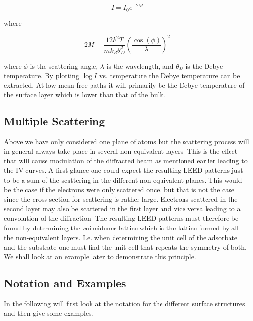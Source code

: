 \begin{equation}
I=I_0e^{-2M}
\end{equation}

\noindent where

\begin{equation}
2M=\frac{12h^2T}{mk_B\theta_D^2}\left(\frac{\cos(\phi)}{\lambda}\right)^2
\end{equation}

\noindent where $\phi$ is the scattering angle, $\lambda$ is the wavelength, and $\theta_D$ is the Debye temperature. By plotting $\log{I}$ vs. temperature the Debye temperature can be extracted. At low mean free paths it will primarily be the Debye temperature of the surface layer which is lower than that of the bulk.

\subsection{Multiple Scattering}
Above we have only considered one plane of atoms but the scattering process will in general always take place in several non-equivalent layers. This is the effect that will cause modulation of the diffracted beam as mentioned earlier leading to the IV-curves. A first glance one could expect the resulting LEED patterns just to be a sum of the scattering in the different non-equivalent planes. This would be the case if the electrons were only scattered once, but that is not the case since the cross section for scattering is rather large. Electrons scattered in the second layer may also be scattered in the first layer and vice versa leading to a convolution of the diffraction. The resulting LEED patterns must therefore be found by determining the {\emph coincidence lattice} which is the lattice formed by all the non-equivalent layers. I.e. when determining the unit cell of the adsorbate and the substrate one must find the unit cell that repeats the symmetry of both. We shall look at an example later to demonstrate this principle.

\subsection{Notation and Examples}
In the following will first look at the notation for the different surface structures and then give some examples.

